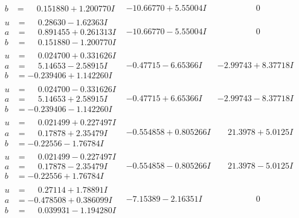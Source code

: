 \documentclass[1p]{elsarticle_modified}
\theoremstyle{definition}
\begin{document}
$$\begin{array}{c|c|c}
\begin{aligned}
b &= \phantom{-}0.151880 + 1.200770 I\end{aligned}
 & -10.66770 + 5.55004 I & \phantom{-0.000000 } 0 \\ \hline\begin{aligned}
u &= \phantom{-}0.28630 - 1.62363 I \\
a &= \phantom{-}0.891455 + 0.261313 I \\
b &= \phantom{-}0.151880 - 1.200770 I\end{aligned}
 & -10.66770 - 5.55004 I & \phantom{-0.000000 } 0 \\ \hline\begin{aligned}
u &= \phantom{-}0.024700 + 0.331626 I \\
a &= \phantom{-}5.14653 - 2.58915 I \\
b &= -0.239406 + 1.142260 I\end{aligned}
 & -0.47715 - 6.65366 I & -2.99743 + 8.37718 I \\ \hline\begin{aligned}
u &= \phantom{-}0.024700 - 0.331626 I \\
a &= \phantom{-}5.14653 + 2.58915 I \\
b &= -0.239406 - 1.142260 I\end{aligned}
 & -0.47715 + 6.65366 I & -2.99743 - 8.37718 I \\ \hline\begin{aligned}
u &= \phantom{-}0.021499 + 0.227497 I \\
a &= \phantom{-}0.17878 + 2.35479 I \\
b &= -0.22556 - 1.76784 I\end{aligned}
 & -0.554858 + 0.805266 I & \phantom{-}21.3978 + 5.0125 I \\ \hline\begin{aligned}
u &= \phantom{-}0.021499 - 0.227497 I \\
a &= \phantom{-}0.17878 - 2.35479 I \\
b &= -0.22556 + 1.76784 I\end{aligned}
 & -0.554858 - 0.805266 I & \phantom{-}21.3978 - 5.0125 I \\ \hline\begin{aligned}
u &= \phantom{-}0.27114 + 1.78891 I \\
a &= -0.478508 + 0.386099 I \\
b &= \phantom{-}0.039931 - 1.194280 I\end{aligned}
 & -7.15389 - 2.16351 I & \phantom{-0.000000 } 0 \\ \hline\begin{aligned}

\end{aligned}
\end{array}$$
\end{document}
